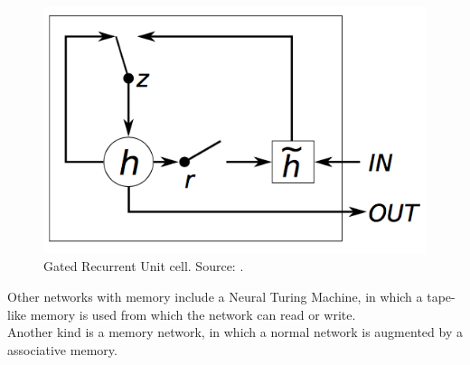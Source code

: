 \begin{figure}[htb]
    \centering
    \includegraphics[width=0.6\linewidth]{images/gru.png}
    \caption[Gated Recurrent Unit cell]{Gated Recurrent Unit cell. Source: \cite{journals/corr/ChungGCB14}.}
    \label{fig:gru}
\end{figure}

Other networks with memory include a Neural Turing Machine, in which a tape-like memory is used from which the network can read or write.\\
Another kind is a memory network, in which a normal network is augmented by a associative memory.\\
